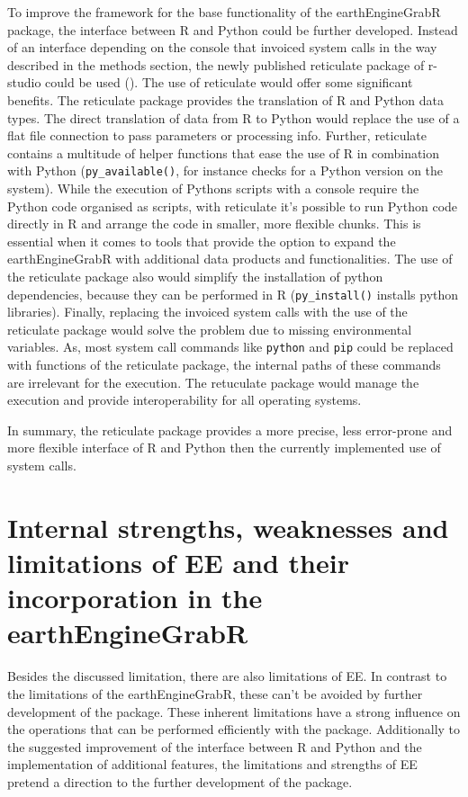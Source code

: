 To improve the framework for the base functionality of the earthEngineGrabR package, the interface between R and Python could be further developed. Instead of an interface depending on the console that invoiced system calls in the way described in the methods section, the newly published reticulate package of r-studio could be used (\cite{reticulate}). The use of reticulate would offer some significant benefits. The reticulate package provides the translation of R and Python data types. The direct translation of data from R to Python would replace the use of a flat file connection to pass parameters or processing info. Further, reticulate contains a multitude of helper functions that ease the use of R in combination with Python (\texttt{py\_available()}, for instance checks for a Python version on the system). While the execution of Pythons scripts with a console require the Python code organised as scripts, with reticulate it's possible to run Python code directly in R and arrange the code in smaller, more flexible chunks. This is essential when it comes to tools that provide the option to expand the earthEngineGrabR with additional data products and functionalities. The use of the reticulate package also would simplify the installation of python dependencies, because they can be performed in R (\texttt{py\_install()} installs python libraries). Finally, replacing the invoiced system calls with the use of the reticulate package would solve the problem due to missing environmental variables. As, most system call commands like \texttt{python} and \texttt{pip} could be replaced with functions of the reticulate package, the internal paths of these commands are irrelevant for the execution. The retuculate package would manage the execution and provide interoperability for all operating systems.

In summary, the reticulate package provides a more precise, less error-prone and more flexible interface of R and Python then the currently implemented use of system calls.

\section{Internal strengths, weaknesses and limitations of EE and their incorporation in the earthEngineGrabR}

Besides the discussed limitation, there are also limitations of EE. In contrast to the limitations of the earthEngineGrabR, these can't be avoided by further development of the package. 
These inherent limitations have a strong influence on the operations that can be performed efficiently with the package.
Additionally to the suggested improvement of the interface between R and Python and the
implementation of additional features, the limitations and strengths of EE pretend a direction to the further development of the package.

